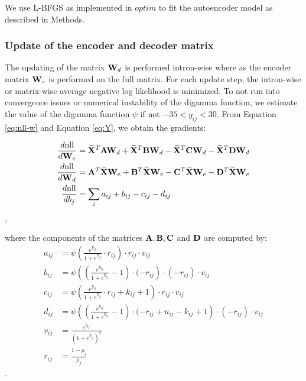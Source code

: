 We use L-BFGS\cite{byrd1995} as implemented in $optim$  to fit the autoencoder
model as described in Methods.


\subsubsection*{Update of the encoder and decoder matrix}

The updating of the matrix $\mathbf{W}_d$ is performed intron-wise where as the 
encoder matrix $\mathbf{W}_e$ is performed on the full matrix. For each update step,
the intron-wise or matrix-wise average negative log likelihood is minimized. 
To not run into convergence issues or numerical instability of the digamma function, 
we estimate the value of the digamma function $\psi$ if not $-35 < y_{ij} < 30$.
From Equation \ref{eq:nll-w} and Equation \ref{eq:Y}, we obtain the gradients:

\begin{align*}
    \frac{d\text{nll}}{d\mathbf{W}_e} &= \mathbf{\widetilde{X}}^T \mathbf{A} \mathbf{W}_d + \mathbf{\widetilde{X}}^T \mathbf{B} \mathbf{W}_d - \mathbf{\widetilde{X}}^T \mathbf{C} \mathbf{W}_d - \mathbf{\widetilde{X}}^T \mathbf{D} \mathbf{W}_d  \\  
    \frac{d\text{nll}}{d\mathbf{W}_d} &= \mathbf{A}^T \mathbf{\widetilde{X}} \mathbf{W}_e + \mathbf{B}^T \mathbf{\widetilde{X}}\mathbf{W}_e - \mathbf{C}^T \mathbf{\widetilde{X}}\mathbf{W}_e - \mathbf{D}^T \mathbf{\widetilde{X}} \mathbf{W}_e \\
    \frac{d\text{nll}}{db_j} &= \sum_{i} a_{ij} + b_{ij} - c_{ij} - d_{ij}
    \end{align*},

where the components of the matrices $\mathbf{A}, \mathbf{B}, \mathbf{C}$ and $\mathbf{D}$ are computed by:
\begin{align*}
	a_{ij} &= \psi \left( \frac{ e^{y_{ij}} }{ 1+e^{y_{ij}} } \cdot r_{ij} \right) \cdot r_{ij} \cdot v_{ij}    \\
	b_{ij} &= \psi \left( \left (\frac{ e^{y_{ij}} }{ 1+e^{y_{ij}} } - 1 \right) \cdot (-r_{ij} \right) \cdot (-r_{ij}) \cdot v_{ij} \\
	c_{ij} &= \psi \left( \frac{ e^{y_{ij}} }{ 1+e^{y_{ij}} } \cdot r_{ij} + k_{ij} + 1 \right) \cdot r_{ij} \cdot v_{ij}    \\
	d_{ij} &= \psi \left( \left (\frac{ e^{y_{ij}} }{ 1+e^{y_{ij}} } - 1 \right) \cdot (-r_{ij} + n_{ij} - k_{ij} + 1 \right) \cdot (-r_{ij}) \cdot v_{ij} \\
	v_{ij} &= \frac{e^{y_{ij}}}{\left(1+e^{y_{ij}}\right)^2} \\
    r_{ij} &= \frac{1 - \rho_{j} }{ \rho_j }  
\end{align*}.

